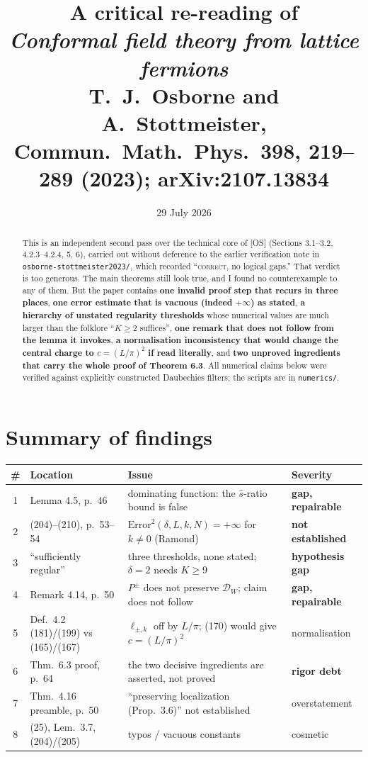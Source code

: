 \documentclass[11pt,a4paper]{article}
\title{A critical re-reading of\\
\emph{Conformal field theory from lattice fermions}\\
\normalsize T.~J.~Osborne and A.~Stottmeister, Commun.\ Math.\ Phys.\ \textbf{398}, 219--289 (2023); arXiv:2107.13834}
\author{}
\date{29 July 2026}
\theoremstyle{definition}
\newcommand{\DW}{\mathcal{D}_W}
\newcommand{\sh}{\hat{s}}
\newcommand{\OS}{\textup{[OS]}}
\begin{document}
\maketitle
\vspace{-2.2em}

\begin{abstract}
\noindent
This is an independent second pass over the technical core of \OS{} (Sections 3.1--3.2, 4.2.3--4.2.4,
5, 6), carried out without deference to the earlier verification note in
\texttt{osborne-stottmeister2023/}, which recorded ``\textsc{correct}, no logical gaps.''
That verdict is too generous. The main theorems still look true, and I found no
counterexample to any of them. But the paper contains \textbf{one invalid proof step
that recurs in three places}, \textbf{one error estimate that is vacuous (indeed $+\infty$)
as stated}, \textbf{a hierarchy of unstated regularity thresholds} whose numerical values are
much larger than the folklore ``$K\ge 2$ suffices'', \textbf{one remark that does not follow
from the lemma it invokes}, \textbf{a normalisation inconsistency that would change the
central charge to $c=(L/\pi)^2$ if read literally}, and \textbf{two unproved ingredients that
carry the whole proof of Theorem 6.3}. All numerical claims below were verified against
explicitly constructed Daubechies filters; the scripts are in \texttt{numerics/}.
\end{abstract}

\section*{Summary of findings}
\begin{center}
\footnotesize
\begin{tabular}{cp{4.1cm}p{6.5cm}l}
\toprule
\# & Location & Issue & Severity \\
\midrule
1 & Lemma 4.5, p.~46 & dominating function: the $\sh$-ratio bound is false & \textbf{gap, repairable} \\
2 & (204)--(210), p.~53--54 & $\mathrm{Error}^2(\delta,L,k,N)=+\infty$ for $k\neq0$ (Ramond) & \textbf{not established} \\
3 & ``sufficiently regular'' & three thresholds, none stated; $\delta{=}2$ needs $K\ge9$ & \textbf{hypothesis gap} \\
4 & Remark 4.14, p.~50 & $P^\pm$ does not preserve $\DW$; claim does not follow & \textbf{gap, repairable} \\
5 & Def.~4.2 (181)/(199) vs (165)/(167) & $\ell_{\pm,k}$ off by $L/\pi$; (170) would give $c=(L/\pi)^2$ & normalisation \\
6 & Thm.~6.3 proof, p.~64 & the two decisive ingredients are asserted, not proved & \textbf{rigor debt} \\
7 & Thm.~4.16 preamble, p.~50 & ``preserving localization (Prop.~3.6)'' not established & overstatement \\
8 & (25), Lem.~3.7, (204)/(205) & typos / vacuous constants & cosmetic \\
\bottomrule
\end{tabular}
\end{center}
\end{document}
